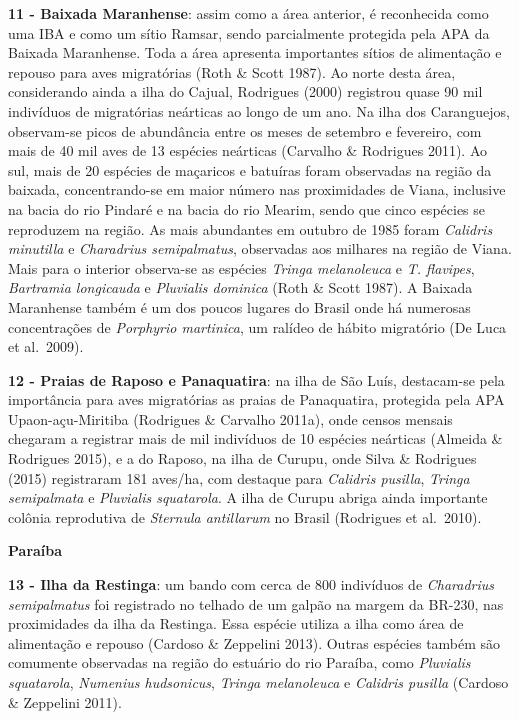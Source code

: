 \documentclass[
  oneside]{scrbook}
\begin{document}
\textbf{11 - Baixada Maranhense}: assim como a área anterior, é reconhecida como uma IBA e como um sítio Ramsar, sendo parcialmente protegida pela APA da Baixada Maranhense. Toda a área apresenta importantes sítios de alimentação e repouso para aves migratórias (Roth \& Scott 1987). Ao norte desta área, considerando ainda a ilha do Cajual, Rodrigues (2000) registrou quase 90 mil indivíduos de migratórias neárticas ao longo de um ano. Na ilha dos Caranguejos, observam-se picos de abundância entre os meses de setembro e fevereiro, com mais de 40 mil aves de 13 espécies neárticas (Carvalho \& Rodrigues 2011). Ao sul, mais de 20 espécies de maçaricos e batuíras foram observadas na região da baixada, concentrando-se em maior número nas proximidades de Viana, inclusive na bacia do rio Pindaré e na bacia do rio Mearim, sendo que cinco espécies se reproduzem na região. As mais abundantes em outubro de 1985 foram \emph{Calidris minutilla} e \emph{Charadrius semipalmatus}, observadas aos milhares na região de Viana. Mais para o interior observa-se as espécies \emph{Tringa melanoleuca} e \emph{T. flavipes}, \emph{Bartramia longicauda} e \emph{Pluvialis dominica} (Roth \& Scott 1987). A Baixada Maranhense também é um dos poucos lugares do Brasil onde há numerosas concentrações de \emph{Porphyrio martinica}, um ralídeo de hábito migratório (De Luca et al.~2009).

\textbf{12 - Praias de Raposo e Panaquatira}: na ilha de São Luís, destacam-se pela importância para aves migratórias as praias de Panaquatira, protegida pela APA Upaon-açu-Miritiba (Rodrigues \& Carvalho 2011a), onde censos mensais chegaram a registrar mais de mil indivíduos de 10 espécies neárticas (Almeida \& Rodrigues 2015), e a do Raposo, na ilha de Curupu, onde Silva \& Rodrigues (2015) registraram 181 aves/ha, com destaque para \emph{Calidris pusilla}, \emph{Tringa semipalmata} e \emph{Pluvialis squatarola}. A ilha de Curupu abriga ainda importante colônia reprodutiva de \emph{Sternula antillarum} no Brasil (Rodrigues et al.~2010).

\textbf{Paraíba}

\textbf{13 - Ilha da Restinga}: um bando com cerca de 800 indivíduos de \emph{Charadrius semipalmatus} foi registrado no telhado de um galpão na margem da BR-230, nas proximidades da ilha da Restinga. Essa espécie utiliza a ilha como área de alimentação e repouso (Cardoso \& Zeppelini 2013). Outras espécies também são comumente observadas na região do estuário do rio Paraíba, como \emph{Pluvialis squatarola}, \emph{Numenius hudsonicus}, \emph{Tringa melanoleuca} e \emph{Calidris pusilla} (Cardoso \& Zeppelini 2011).
\end{document}
